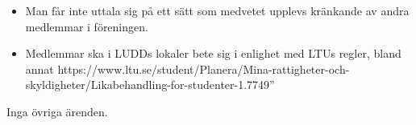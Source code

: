 \documentclass{protokoll}
\begin{document}
\begin{itemize}
  \item Man får inte uttala sig på ett sätt som medvetet upplevs kränkande av andra medlemmar i föreningen.
  \item Medlemmar ska i LUDDs lokaler bete sig i enlighet med LTUs regler, bland annat https://www.ltu.se/student/Planera/Mina-rattigheter-och-skyldigheter/Likabehandling-for-studenter-1.7749''
\end{itemize}

Inga övriga ärenden.
\end{document}
